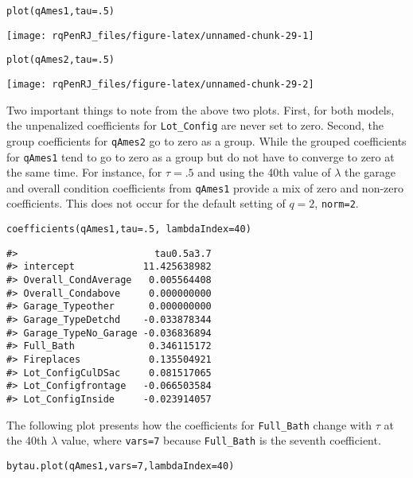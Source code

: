 \begin{verbatim}
plot(qAmes1,tau=.5)
\end{verbatim}

\begin{center}\texttt{[image: rqPenRJ\_files/figure-latex/unnamed-chunk-29-1]} \end{center}

\begin{verbatim}
plot(qAmes2,tau=.5)
\end{verbatim}

\begin{center}\texttt{[image: rqPenRJ\_files/figure-latex/unnamed-chunk-29-2]} \end{center}

Two important things to note from the above two plots. First, for both models, the unpenalized coefficients for \texttt{Lot\_Config} are never set to zero. Second, the group coefficients for \texttt{qAmes2} go to zero as a group. While the grouped coefficients for \texttt{qAmes1} tend to go to zero as a group but do not have to converge to zero at the same time. For instance, for \(\tau=.5\) and using the 40th value of \(\lambda\) the garage and overall condition coefficients from \texttt{qAmes1} provide a mix of zero and non-zero coefficients. This does not occur for the default setting of \(q=2\), \texttt{norm=2}.

\begin{verbatim}
coefficients(qAmes1,tau=.5, lambdaIndex=40)
\end{verbatim}

\begin{verbatim}
#>                        tau0.5a3.7
#> intercept            11.425638982
#> Overall_CondAverage   0.005564408
#> Overall_Condabove     0.000000000
#> Garage_Typeother      0.000000000
#> Garage_TypeDetchd    -0.033878344
#> Garage_TypeNo_Garage -0.036836894
#> Full_Bath             0.346115172
#> Fireplaces            0.135504921
#> Lot_ConfigCulDSac     0.081517065
#> Lot_Configfrontage   -0.066503584
#> Lot_ConfigInside     -0.023914057
\end{verbatim}

The following plot presents how the coefficients for \texttt{Full\_Bath} change with \(\tau\) at the 40th \(\lambda\) value, where \texttt{vars=7} because \texttt{Full\_Bath} is the seventh coefficient.

\begin{verbatim}
bytau.plot(qAmes1,vars=7,lambdaIndex=40)
\end{verbatim}

